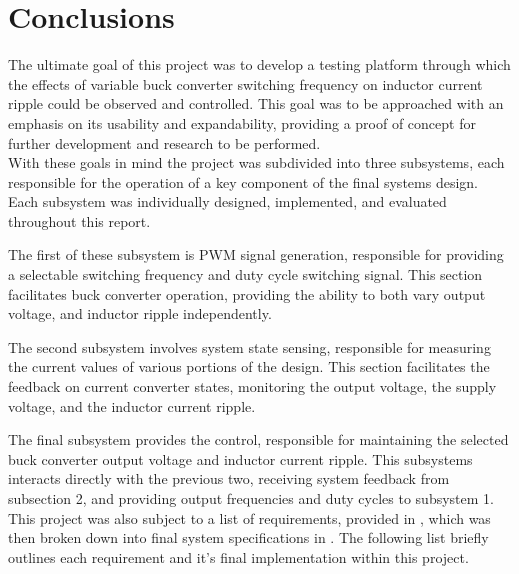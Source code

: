 \chapter{Conclusions}\label{C:conclusion}

The ultimate goal of this project was to develop a testing platform through which the effects of variable buck converter switching frequency on inductor current ripple could be observed and controlled. This goal was to be approached with an emphasis on its usability and expandability, providing a proof of concept for further development and research to be performed.\\

With these goals in mind the project was subdivided into three subsystems, each responsible for the operation of a key component of the final systems design. Each subsystem was individually designed, implemented, and evaluated throughout this report.

The first of these subsystem is PWM signal generation, responsible for providing a selectable switching frequency and duty cycle switching signal. This section facilitates buck converter operation, providing the ability to both vary output voltage, and inductor ripple independently. 

The second subsystem involves system state sensing, responsible for measuring the current values of various portions of the design. This section facilitates the feedback on current converter states, monitoring the output voltage, the supply voltage, and the inductor current ripple. 

The final subsystem provides the control, responsible for maintaining the selected buck converter output voltage and inductor current ripple. This subsystems interacts directly with the previous two, receiving system feedback from subsection 2, and providing output frequencies and duty cycles to subsystem 1.\\

This project was also subject to a list of requirements, provided in , which was then broken down into final system specifications in . The following list briefly outlines each requirement and it's final implementation within this project.\\

